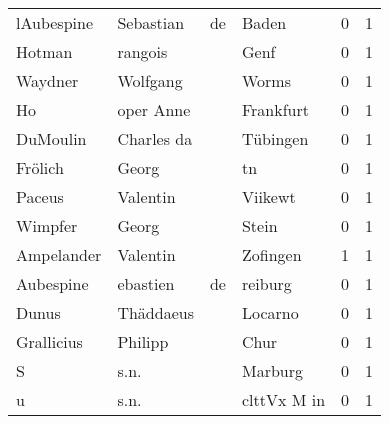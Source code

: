 \begin{tabular}{llllrr}
               lAubespine &                          Sebastian &          de &                                       Baden &          0 &         1 \\
                   Hotman &                            rangois &             &                                        Genf &          0 &         1 \\
                  Waydner &                           Wolfgang &             &                                       Worms &          0 &         1 \\
                       Ho &                          oper Anne &             &                                   Frankfurt &          0 &         1 \\
                 DuMoulin &                         Charles da &             &                                    Tübingen &          0 &         1 \\
                  Frölich &                              Georg &             &                                          tn &          0 &         1 \\
                   Paceus &                           Valentin &             &                                     Viikewt &          0 &         1 \\
                  Wimpfer &                              Georg &             &                                       Stein &          0 &         1 \\
               Ampelander &                           Valentin &             &                                    Zofingen &          1 &         1 \\
                Aubespine &                           ebastien &          de &                                     reiburg &          0 &         1 \\
                    Dunus &                          Thäddaeus &             &                                     Locarno &          0 &         1 \\
               Grallicius &                            Philipp &             &                                        Chur &          0 &         1 \\
                        S &                               s.n. &             &                                     Marburg &          0 &         1 \\
                        u &                               s.n. &             &                                 clttVx M in &          0 &         1 \\

\end{tabular}
